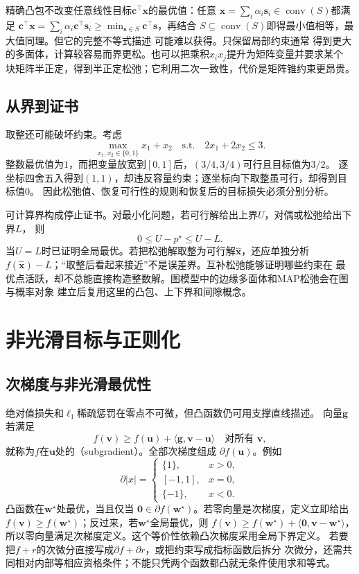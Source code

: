 精确凸包不改变任意线性目标$\bm{c}^{\top}\bm{x}$的最优值：任意
$\bm{x}=\sum_i\alpha_i\bm{s}_i\in\operatorname{conv}(S)$都满足
$\bm{c}^{\top}\bm{x}=\sum_i\alpha_i\bm{c}^{\top}\bm{s}_i
\geq\min_{\bm{s}\in S}\bm{c}^{\top}\bm{s}$，再结合
$S\subseteq\operatorname{conv}(S)$即得最小值相等，最大值同理。但它的完整不等式描述
可能难以获得。只保留局部约束通常
得到更大的多面体，计算较容易而界更松。也可以把乘积$x_ix_j$提升为矩阵变量并要求某个
块矩阵半正定，得到半正定松弛；它利用二次一致性，代价是矩阵锥约束更昂贵。

\subsection{从界到证书}

取整还可能破坏约束。考虑
\[
  \max_{x_1,x_2\in\{0,1\}}x_1+x_2
  \quad\text{s.t.}\quad 2x_1+2x_2\leq3.
\]
整数最优值为$1$，而把变量放宽到$[0,1]$后，$(3/4,3/4)$可行且目标值为$3/2$。
逐坐标四舍五入得到$(1,1)$，却违反容量约束；逐坐标向下取整虽可行，却得到目标值$0$。
因此松弛值、恢复可行性的规则和恢复后的目标损失必须分别分析。

可计算界构成停止证书。对最小化问题，若可行解给出上界$U$，对偶或松弛给出下界$L$，
则
\[
  0\leq U-p^\star\leq U-L.
\]
当$U=L$时已证明全局最优。若把松弛解取整为可行解$\widehat{\bm{x}}$，还应单独分析
$f(\widehat{\bm{x}})-L$；“取整后看起来接近”不是误差界。互补松弛能够证明哪些约束在
最优点活跃，却不总能直接构造整数解。图模型中的边缘多面体和MAP松弛会在图与概率对象
建立后复用这里的凸包、上下界和间隙概念。

\section{非光滑目标与正则化}
\label{sec:opt-nonsmooth-proximal}

\subsection{次梯度与非光滑最优性}

绝对值损失和$\ell_1$稀疏惩罚在零点不可微，但凸函数仍可用支撑直线描述。
向量$\bm{g}$若满足
\[
  f(\bm{v})\geq f(\bm{u})+\langle\bm{g},\bm{v}-\bm{u}\rangle
  \quad\text{对所有 }\bm{v},
\]
就称为$f$在$\bm{u}$处的（subgradient）。全部次梯度组成
$\partial f(\bm{u})$。例如
\[
  \partial |x|=
  \begin{cases}
    \{1\},&x>0,\\
    [-1,1],&x=0,\\
    \{-1\},&x<0.
  \end{cases}
\]
凸函数在$\bm{w}^{\star}$处最优，当且仅当
$\bm{0}\in\partial f(\bm{w}^{\star})$。若零向量是次梯度，定义立即给出
$f(\bm{v})\geq f(\bm{w}^{\star})$；反过来，若$\bm{w}^{\star}$全局最优，则
$f(\bm{v})\geq f(\bm{w}^{\star})+\langle\bm{0},\bm{v}-\bm{w}^{\star}\rangle$，
所以零向量满足次梯度定义。这个等价性依赖凸次梯度采用全局下界定义。
若要把$f+r$的次微分直接写成$\partial f+\partial r$，或把约束写成指标函数后拆分
次微分，还需共同相对内部等相应资格条件；不能只凭两个函数都凸就无条件使用求和等式。

